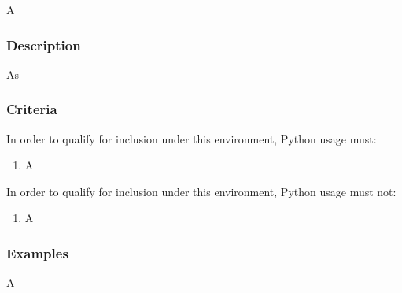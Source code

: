 			A

		\subsubsection{Description}

			As

		\subsubsection{Criteria}

			In order to qualify for inclusion under this environment, Python usage must:

			\begin{enumerate}
        		\item A
        	\end{enumerate}

			In order to qualify for inclusion under this environment, Python usage must not:

			\begin{enumerate}
        		\item A
        	\end{enumerate}

		\subsubsection{Examples}

			A
